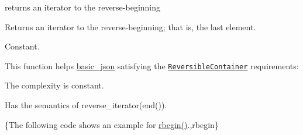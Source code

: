 returns an iterator to the reverse-\/beginning 

Returns an iterator to the reverse-\/beginning; that is, the last element.

  Constant.

This function helps {\ttfamily \hyperlink{classnlohmann_1_1basic__json}{basic\-\_\-json}} satisfying the \href{http://en.cppreference.com/w/cpp/concept/ReversibleContainer}{\tt Reversible\-Container} requirements\-:
\begin{DoxyItemize}
\item The complexity is constant.
\item Has the semantics of {\ttfamily reverse\-\_\-iterator(end())}.
\end{DoxyItemize}

\{The following code shows an example for {\ttfamily \hyperlink{classnlohmann_1_1basic__json_a62ccf5b9b3674aec2403fbc02da03db8}{rbegin()}}.,rbegin\}


